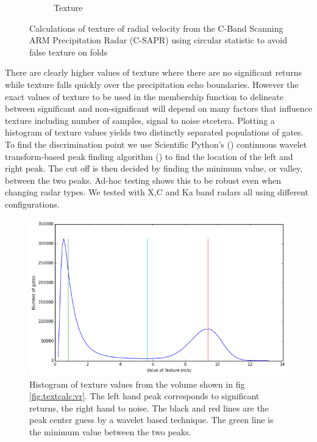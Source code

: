 \documentclass[twocol]{ametsoc}
\begin{document}
\begin{figure}[h]
\begin{subfigure}[b]{0.4\columnwidth}
        \caption{Texture}
        \label{fig:textcalc:tx}
    \end{subfigure}
    \caption{Calculations of texture of radial velocity from the C-Band Scanning ARM Precipitation Radar (C-SAPR) using circular statistic to avoid false texture on folds}
\end{figure}

There are clearly higher values of texture where there are no significant returns while texture falls 
quickly over the precipitation echo boundaries. However the exact values of texture to be used 
in the membership function to delineate between significant and non-significant will depend on 
many factors that influence texture including number of samples, signal to noise etcetera.
 Plotting a histogram of texture values yields  two distinctly separated populations of gates. 
 To find the discrimination point we use Scientific Python's (\cite{scipy}) continuous wavelet transform-based
 peak finding algorithm (\cite{Du01092006}) to find the location of the left and right peak. The cut off is then
 decided by finding the minimum value, or valley, between the two peaks. Ad-hoc testing shows this to be robust
 even when changing radar types. We tested with X,C and Ka band radars all using different configurations. 
 

\begin{figure}[h]
    \centering
    \includegraphics[width=0.95\columnwidth]{peak_finding.png}
    \caption{Histogram of texture values from the volume shown in fig \ref{fig:textcalc:vr}. The left hand peak corresponds to 
    significant returns, the right hand to noise. The black and red lines are the peak center guess by a wavelet based technique. 
    The green line is the minimum value between the two peaks. }
    \label{fig:grid}
\end{figure}
\end{document}
